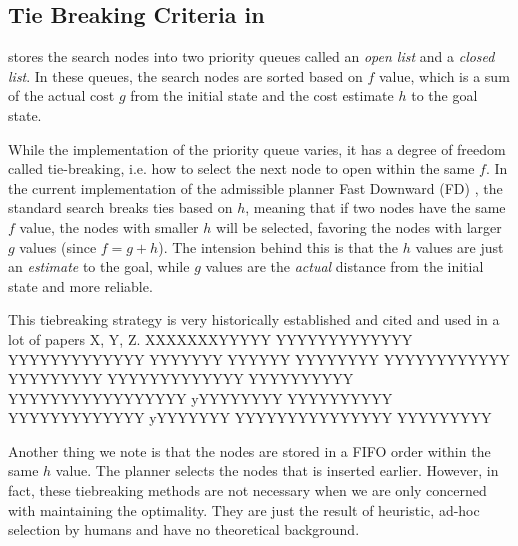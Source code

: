
\subsection{Tie Breaking Criteria in \astar}


\astar stores the search nodes into two priority queues called an
\emph{open list} and a \emph{closed list}. In these queues, the search
nodes are sorted based on $f$ value, which is a sum of the actual cost
$g$ from the initial state and the cost estimate $h$ to the goal
state.

While the implementation of the priority queue varies, it has a degree
of freedom called tie-breaking, i.e. how to select the next node to open
within the same $f$.
In the current implementation of the \sota admissible planner Fast Downward (FD) \cite{Helmert2006}, the standard \astar search breaks ties based on $h$, meaning that if two nodes have the same $f$ value, the nodes with smaller $h$ will be selected, favoring the nodes with larger $g$ values (since $f=g+h$). The intension behind this is that the $h$ values are just an \emph{estimate} to the goal, while $g$ values are the \emph{actual} distance from the initial state and more reliable.

This tiebreaking strategy is very historically established and cited and
used in a lot of papers X, Y, Z. XXXXXXXYYYYY YYYYYYYYYYYYY
YYYYYYYYYYYYY YYYYYYY YYYYYY YYYYYYYY YYYYYYYYYYYY YYYYYYYYY
YYYYYYYYYYYYY YYYYYYYYYY YYYYYYYYYYYYYYYYY yYYYYYYYY YYYYYYYYYY
YYYYYYYYYYYYY yYYYYYYY YYYYYYYYYYYYYYY YYYYYYYYY

Another thing we note is that the nodes are stored in a FIFO order
within the same $h$ value. The planner selects the nodes that is inserted earlier. 
However, in fact, these tiebreaking methods are not necessary when we are only concerned with  maintaining the optimality. They are just the result of heuristic, ad-hoc selection by humans and have no theoretical background.

